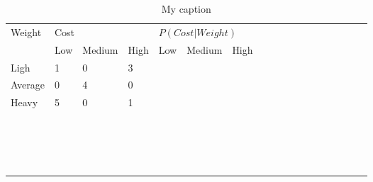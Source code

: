 \documentclass[letterpaper,12pt]{article}
\begin{document}
\begin{table}[]
\centering
\caption{My caption}
\label{my-label}
\begin{tabular}{llllllllllllllllll}
\cline{1-7}
\multicolumn{1}{|l|}{\multirow{2}{*}{Weight}} & \multicolumn{3}{l|}{Cost} & \multicolumn{3}{l|}{$P\left(Cost | Weight\right)$} &  &  &  &  &  &  &  &  &  &  &  \\
\multicolumn{1}{|l|}{} & Low & Medium & \multicolumn{1}{l|}{High} & Low & Medium & \multicolumn{1}{l|}{High} &  &  &  &  &  &  &  &  &  &  &  \\ \cline{1-7}
\multicolumn{1}{|l|}{Ligh} & \multicolumn{1}{l|}{1} & \multicolumn{1}{l|}{0} & \multicolumn{1}{l|}{3} &  &  &  &  &  &  &  &  &  &  &  &  &  &  \\
\multicolumn{1}{|l|}{Average} & \multicolumn{1}{l|}{0} & \multicolumn{1}{l|}{4} & \multicolumn{1}{l|}{0} &  &  &  &  &  &  &  &  &  &  &  &  &  &  \\
\multicolumn{1}{|l|}{Heavy} & \multicolumn{1}{l|}{5} & \multicolumn{1}{l|}{0} & \multicolumn{1}{l|}{1} &  &  &  &  &  &  &  &  &  &  &  &  &  &  \\ \cline{1-4}
 &  &  &  &  &  &  &  &  &  &  &  &  &  &  &  &  &  \\
 &  &  &  &  &  &  &  &  &  &  &  &  &  &  &  &  &  \\
 &  &  &  &  &  &  &  &  &  &  &  &  &  &  &  &  &  \\
 &  &  &  &  &  &  &  &  &  &  &  &  &  &  &  &  &  \\
 &  &  &  &  &  &  &  &  &  &  &  &  &  &  &  &  &  \\
 &  &  &  &  &  &  &  &  &  &  &  &  &  &  &  &  &  \\
 &  &  &  &  &  &  &  &  &  &  &  &  &  &  &  &  &  \\
 &  &  &  &  &  &  &  &  &  &  &  &  &  &  &  &  &  \\
 &  &  &  &  &  &  &  &  &  &  &  &  &  &  &  &  &  \\
 &  &  &  &  &  &  &  &  &  &  &  &  &  &  &  &  &  \\
 &  &  &  &  &  &  &  &  &  &  &  &  &  &  &  &  &  \\
 &  &  &  &  &  &  &  &  &  &  &  &  &  &  &  &  &  \\
 &  &  &  &  &  &  &  &  &  &  &  &  &  &  &  &  &  \\
 &  &  &  &  &  &  &  &  &  &  &  &  &  &  &  &  &  \\
 &  &  &  &  &  &  &  &  &  &  &  &  &  &  &  &  &  \\
 &  &  &  &  &  &  &  &  &  &  &  &  &  &  &  &  &  \\
 &  &  &  &  &  &  &  &  &  &  &  &  &  &  &  &  & 
\end{tabular}
\end{table}
\end{document}
